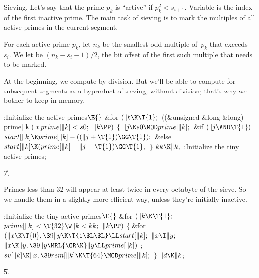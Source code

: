 Sieving. Let's say that the prime $p_k$ is
``active'' if $p_k^2<s_{i+1}$.
Variable  is the index of the first inactive prime.
The main task of sieving is to mark the multiples of all active
primes in the current segment.

For each active prime $p_k$, let $n_k$ be the smallest odd multiple of~$p_k$
that exceeds $s_i$. We let  be $(n_k-s_i-1)/2$, the bit
offset
of the first such multiple that needs to be marked.

At the beginning, we compute  by division. But we'll
be able to compute  for subsequent segments as a byproduct
of
sieving, without division; that's why we bother to keep  in
memory.

\Y\B\4:Initialize the active primes\X${}\E{}$\6
\&{for} ${}(\|k\K\T{1};{}$ ((\&{unsigned} \&{long} \&{long}) \\{prime}[%
\|k])${}*\\{prime}[\|k]<\\{s0};{}$ ${}\|k\PP){}$\5
${}\{{}$\1\6
${}\|j\K\\{s0}\MOD\\{prime}[\|k];{}$\6
\&{if} ${}(\|j\AND\T{1}){}$\1\5
${}\\{start}[\|k]\K\\{prime}[\|k]-((\|j+\T{1})\GG\T{1});{}$\2\6
\&{else}\1\5
${}\\{start}[\|k]\K(\\{prime}[\|k]-\|j-\T{1})\GG\T{1};{}$\2\6
\4${}\}{}$\2\6
${}\\{kk}\K\|k;{}$\6
:Initialize the tiny active primes\X;\par
\U7.\fi

Primes less than 32 will appear at least twice in every
octabyte of
the sieve. So we handle them in a slightly more efficient way, unless
they're initially inactive.

\Y\B\4:Initialize the tiny active primes\X${}\E{}$\6
\&{for} ${}(\|k\K\T{1};{}$ ${}\\{prime}[\|k]<\T{32}\W\|k<\\{kk};{}$ ${}\|k%
\PP){}$\5
${}\{{}$\1\6
\&{for} ${}(\|x\K\T{0},\39\|y\K\T{1\$L\$L}\LL\\{start}[\|k];{}$ ${}\|x\I\|y;{}$
${}\|x\K\|y,\39\|y\MRL{{\OR}{\K}}\|y\LL\\{prime}[\|k]){}$\1\5
;\2\6
${}\\{sv}[\|k]\K\|x,\39\\{rem}[\|k]\K\T{64}\MOD\\{prime}[\|k];{}$\6
\4${}\}{}$\2\6
${}\|d\K\|k{}$;\par
\U5.\fi

